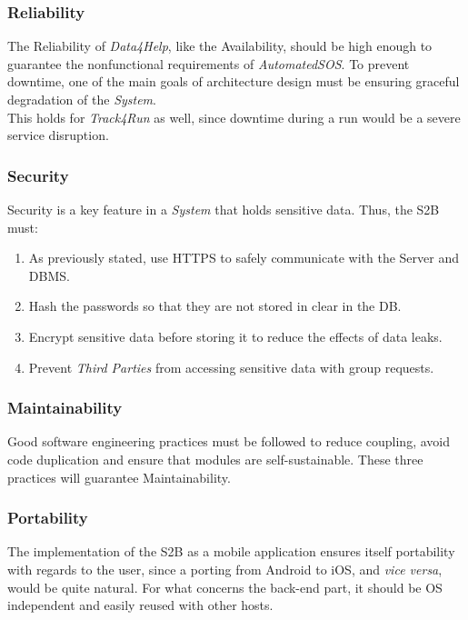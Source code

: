 \documentclass[titlepage]{article}
\begin{document}
			\subsubsection{Reliability}
			The Reliability of {\it Data4Help}, like the Availability, should be high enough to guarantee the nonfunctional 				requirements of {\it AutomatedSOS}. To prevent downtime, one of the main goals of architecture design must be 			ensuring graceful degradation of the {\it System}.\\
			This holds for {\it Track4Run} as well, since downtime during a run would be a severe service disruption.\\
			\subsubsection{Security}
			Security is a key feature in a {\it System} that holds sensitive data. Thus, the S2B must:
			\begin{enumerate}
				\item As previously stated, use HTTPS to safely communicate with the Server and DBMS.
				\item Hash the passwords so that they are not stored in clear in the DB.
				\item Encrypt sensitive data before storing it to reduce the effects of data leaks.
				\item Prevent {\it Third Parties} from accessing sensitive data with group requests.
			\end{enumerate}
			\subsubsection{Maintainability}
			Good software engineering practices must be followed to reduce coupling, avoid code duplication and ensure 			that modules are self-sustainable. These three practices will guarantee Maintainability.\\
			\subsubsection{Portability}
			The implementation of the S2B as a mobile application ensures itself portability with regards to the user, since 			a porting from Android to iOS, and {\it vice versa}, would be quite natural. For what concerns the back-end 			part, it should be OS independent and easily reused with other hosts. \\
	
	\pagebreak	
		
\end{document}
